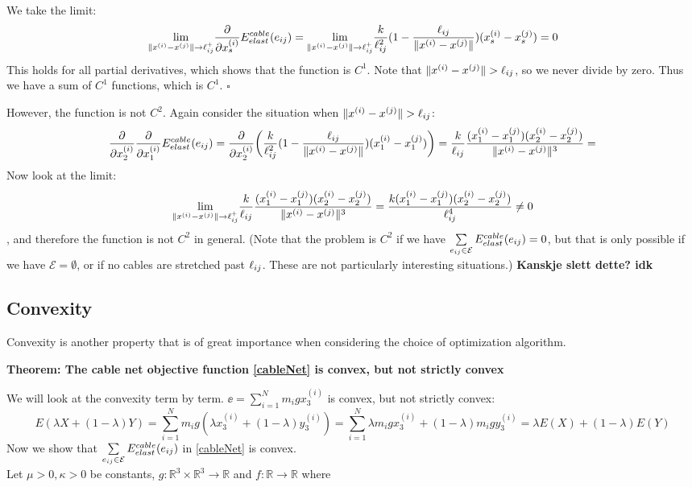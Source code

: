 We take the limit:
\begin{equation}
    \underset{\lVert x^{(i)} - x^{(j)}\rVert \to \ell_{ij} ^+}{\text{lim}} \frac{\partial}{\partial x_s^{(i)}} E^{cable}_{elast}(e_{ij}) =    \underset{\lVert x^{(i)} - x^{(j)}\rVert \to \ell_{ij} ^+}{\text{lim}} \frac{k}{\ell_{ij}^2} (1- \frac{\ell_{ij}}{\lVert x^{(i)} - x^{(j)}\rVert}) (x_s^{(i)} - x_s^{(j)}) = 0
\end{equation}
This holds for all partial derivatives, which shows that the function is $C^1$. Note that $\lVert x^{(i)} - x^{(j)}\rVert>\ell_{ij}$, so we never divide by zero. Thus we have a sum of $C^1$ functions, which is $C^1$. \hfill $\square$ 

However, the function is not $C^2$. Again consider the situation when $\lVert x^{(i)} - x^{(j)}\rVert > \ell_{ij}$:
\begin{equation*}
    \frac{\partial}{\partial x_2^{(i)}} \frac{\partial}{\partial x_1^{(i)}} E^{cable}_{elast}(e_{ij}) = \frac{\partial}{\partial x_2^{(i)}}  \bigg (\frac{k}{\ell_{ij}^2} (1- \frac{\ell_{ij}}{\lVert x^{(i)} - x^{(j)}\rVert}) (x_1^{(i)} - x_1^{(j)}) \bigg) = \frac{k}{\ell_{ij}} \frac{(x_1^{(i)} - x_1^{(j)}) (x_2^{(i)}-x_2^{(j)})}{\lVert x^{(i)} - x^{(j)}\rVert^3} = 
\end{equation*}
Now look at the limit: $$ \underset{\lVert x^{(i)} - x^{(j)}\rVert \to \ell_{ij} ^+}{\text{lim}} \frac{k}{\ell_{ij}}\frac{ (x_1^{(i)} - x_1^{(j)}) (x_2^{(i)}-x_2^{(j)})}{\lVert x^{(i)} - x^{(j)}\rVert^3} = \frac{k (x_1^{(i)} - x_1^{(j)}) (x_2^{(i)}-x_2^{(j)})}{\ell_{ij}^4} \neq 0 $$, and therefore the function is not $C^2$ in general. (Note that the problem is $C^2$ if we have
$\sum\limits_{e_{ij} \in \mathcal{E}} E^{cable}_{elast}(e_{ij}) = 0$, but that is only possible if we have $\mathcal{E} = \emptyset$, or if no cables are stretched past $\ell_{ij}$. These are not particularly interesting situations.)
\textbf{Kanskje slett dette? idk}


\subsection{Convexity}
Convexity is another property that is of great importance when considering the choice of optimization algorithm. 

\textbf{Theorem: The cable net objective function \eqref{cableNet} is convex, but not strictly convex}

We will look at the convexity term by term.
$\ee =\sum_{i=1}^N m_i g x_3^{(i)}$ is convex, but not strictly convex:
\begin{equation*}
    E(\lambda X +(1-\lambda) Y) = \sum_{i=1}^N m_i g (\lambda x_3^{(i)} + (1-\lambda) y_3^{(i)})
    =\sum_{i=1}^N \lambda m_i g x_3^{(i)} + (1-\lambda) m_i g  y_3^{(i)} = \lambda E(X) + (1-\lambda) E(Y)
\end{equation*} 
Now we show that $\sum\limits_{e_{ij} \in \mathcal{E}} E^{cable}_{elast}(e_{ij})$ in \eqref{cableNet} is convex. \\
Let $\mu > 0, \kappa > 0$  be constants, $g: \mathbb{R}^3 \times \mathbb{R}^3 \rightarrow \mathbb{R}$ and $f: \mathbb{R} \rightarrow \mathbb{R}$ where 

